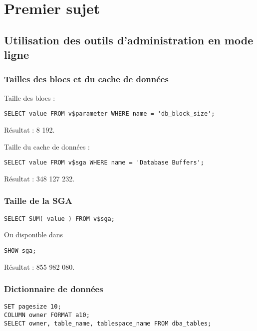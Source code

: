 \section{Premier sujet}
\subsection{Utilisation des outils d’administration en mode ligne}

\subsubsection{Tailles des blocs et du cache de données}

Taille des blocs :
\begin{verbatim}
SELECT value FROM v$parameter WHERE name = 'db_block_size';
\end{verbatim}

Résultat : 8 192.

\hr

Taille du cache de données :
\begin{verbatim}
SELECT value FROM v$sga WHERE name = 'Database Buffers';
\end{verbatim}

Résultat : 348 127 232.

\subsubsection{Taille de la SGA}

\begin{verbatim}
SELECT SUM( value ) FROM v$sga;
\end{verbatim}

Ou disponible dans 
\begin{verbatim}
SHOW sga;
\end{verbatim}

Résultat : 855 982 080.

\subsubsection{Dictionnaire de données}

\begin{verbatim}
SET pagesize 10;
COLUMN owner FORMAT a10;
SELECT owner, table_name, tablespace_name FROM dba_tables;
\end{verbatim}

